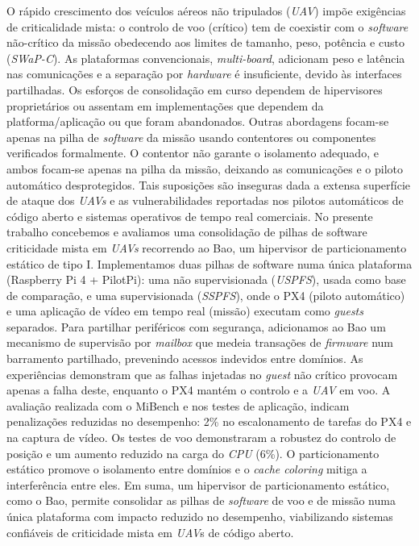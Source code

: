 
%

O rápido crescimento dos veículos aéreos não tripulados (\emph{UAV})
impõe exigências de criticalidade mista: o controlo de voo (crítico) tem de
coexistir com o \emph{software} não-crítico da missão obedecendo aos limites de
tamanho, peso, potência e custo (\emph{SWaP-C}). As plataformas convencionais, \emph{multi-board},
adicionam peso e latência nas comunicações e a separação por \emph{hardware} é
insuficiente, devido às interfaces partilhadas. Os esforços de consolidação em curso
dependem de hipervisores proprietários ou assentam em implementações que
dependem da platforma/aplicação ou que foram abandonados.
%
Outras abordagens focam-se apenas na pilha de \emph{software} da missão usando
contentores ou componentes verificados formalmente. O contentor não garante
o isolamento adequado, e ambos focam-se apenas na pilha da missão,
deixando as comunicações e o piloto automático desprotegidos.
Tais suposições são inseguras dada a extensa superfície de ataque dos
\emph{UAVs} e as vulnerabilidades reportadas nos pilotos automáticos de código
aberto e sistemas operativos de tempo real comerciais.
%
No presente trabalho concebemos e avaliamos uma consolidação de pilhas de software criticidade mista em \emph{UAVs} recorrendo ao Bao, um
hipervisor de particionamento estático de tipo I. Implementamos duas pilhas de
software numa única plataforma (Raspberry Pi 4 + PilotPi): uma não
supervisionada (\emph{USPFS}), usada como base de comparação, e uma supervisionada
(\emph{SSPFS}), onde o PX4 (piloto automático) e uma aplicação de vídeo em tempo
real (missão) executam como \emph{guests} separados. Para partilhar periféricos
com segurança, adicionamos ao Bao um mecanismo de supervisão por \emph{mailbox}
que medeia transações de \emph{firmware} num barramento partilhado, prevenindo
acessos indevidos entre domínios.
%
As experiências demonstram que as falhas injetadas
no \emph{guest} não crítico provocam apenas a falha deste, enquanto o
PX4 mantém o controlo e a \emph{UAV} em voo. A avaliação realizada com o MiBench
e nos testes de aplicação, indicam penalizações reduzidas no desempenho: 2\% no escalonamento de tarefas do PX4 e na captura de
vídeo. Os testes de voo demonstraram a robustez do controlo de posição e um
aumento reduzido na carga do \emph{CPU} (6\%). O particionamento estático
promove o isolamento entre domínios e o \emph{cache coloring} mitiga a interferência entre eles.
%
Em suma, um hipervisor de particionamento estático, como o Bao, permite consolidar as
pilhas de \emph{software} de voo e de missão numa única plataforma com impacto
reduzido no desempenho, viabilizando
sistemas confiáveis de criticidade mista em \emph{UAV}s de código aberto.

